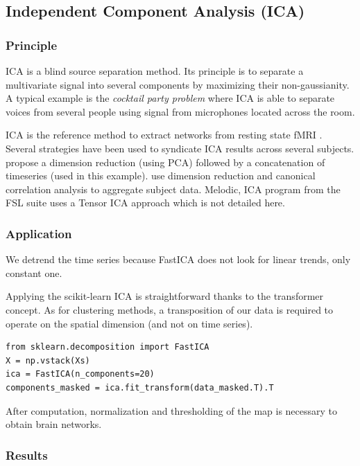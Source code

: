 \documentclass{frontiersSCNS} %
\newcounter{x}
\newcounter{y}
\newcounter{z}
\begin{document}
\subsection{Independent Component Analysis (ICA)}

\subsubsection{Principle}

ICA is a blind source separation method. Its principle is to separate a
multivariate signal into several components by maximizing their non-gaussianity.
A typical example is the \emph{cocktail party problem} where ICA is able to separate
voices from several people using signal from microphones located across the room.

ICA is the reference method to extract networks from resting state
fMRI \citep{kiviniemi2003}. Several strategies have been used to syndicate ICA
results across several subjects. \cite{calhoun2001a} propose a dimension
reduction (using PCA) followed by a concatenation of timeseries (used in this
example). \cite{varoquaux2010} use dimension reduction and canonical correlation analysis
to aggregate subject data. Melodic, ICA program from the FSL suite uses a Tensor
ICA approach which is not detailed here.

\subsubsection{Application}

We detrend the time series because
FastICA does not look for linear trends, only constant one.

Applying the scikit-learn ICA is straightforward thanks to the transformer
concept. As for clustering methods, a transposition of our data is required to
operate on the spatial dimension (and not on time series).

\begin{lstlisting}
from sklearn.decomposition import FastICA
X = np.vstack(Xs)
ica = FastICA(n_components=20)
components_masked = ica.fit_transform(data_masked.T).T
\end{lstlisting}

After computation, normalization and thresholding of the map is necessary to
obtain brain networks.

\subsubsection{Results}
\end{document}
